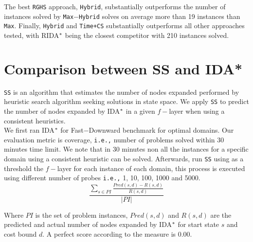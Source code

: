 The best \texttt{RGHS} approach, \texttt{Hybrid}, substantially outperforms the number of instances solved by \texttt{Max$-$Hybrid} solves on average more than 19 instances than \texttt{Max}. Finally, \texttt{Hybrid} and \texttt{Time+CS} substantially outperforms all other approaches tested, with RIDA$\sp{*}$ being the closest competitor with 210 instances solved.


\section{Comparison between SS and IDA*}
\noindent
\texttt{SS} is an algorithm that estimates the number of nodes expanded performed by heuristic search algorithm seeking solutions in state space. We apply \texttt{SS} to predict the number of nodes expanded by IDA$\sp{*}$ in a given $f-$layer when using a consistent heuristics.\\

We first ran IDA$\sp{*}$ for Fast$-$Downward benchmark for optimal domains. Our evaluation metric is coverage, \texttt{i.e.,} number of problems solved within 30 minutes time limit. We note that in 30 minutes non all the instances for a specific domain using a consistent heuristic can be solved. Afterwards, run \texttt{SS} using as a threshold the $f-$layer for each instance of each domain, this process is executed using different number of probes \texttt{i.e.,} 1, 10, 100, 1000 and 5000.\\

\begin{equation}
\frac{\sum_{s\in PI} \frac{Pred(s, d) - R(s, d)}{R(s, d)}}{|PI|}
\label{eq:eq_comparison}
\end{equation}

Where $PI$ is the set of problem instances, $Pred(s,d)$ and $R(s,d)$ are the predicted and actual number of nodes expanded by IDA$\sp{*}$ for start state $s$ and cost bound $d$. A perfect score according to the measure is $0.00$.\\

